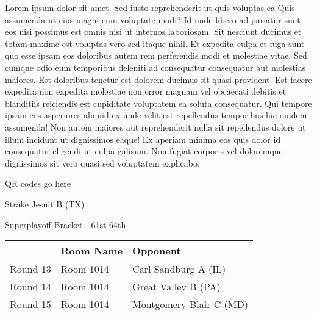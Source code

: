 \documentclass{article}%
\begin{document}
\vspace*{8pt}%
\linebreak%
\newline%
\newline%
Lorem ipsum dolor sit amet. Sed iusto reprehenderit ut quis voluptas ea Quis assumenda ut eius magni eum voluptate modi? Id unde libero ad pariatur sunt eos nisi possimus est omnis nisi ut internos laboriosam. Sit nesciunt ducimus et totam maxime est voluptas vero sed itaque nihil. Et expedita culpa et fuga sunt quo esse ipsam eos doloribus autem rem perferendis modi et molestiae vitae.\newline%
\newline%
Sed cumque odio eum temporibus deleniti ad consequatur consequatur aut molestias maiores. Est doloribus tenetur est dolorem ducimus sit quasi provident. Est facere expedita non expedita molestiae non error magnam vel obcaecati debitis et blanditiis reiciendis est cupiditate voluptatem ea soluta consequatur. Qui tempore ipsam eos asperiores aliquid ex unde velit est repellendus temporibus hic quidem assumenda!\newline%
\newline%
Non autem maiores aut reprehenderit nulla sit repellendus dolore ut illum incidunt ut dignissimos eaque! Ex aperiam minima eos quis dolor id consequatur eligendi ut culpa galisum. Non fugiat corporis vel doloremque dignissimos sit vero quasi sed voluptatem explicabo.\newline%
\newline%
%
\vspace*{30pt}%
\begin{center}%
\begin{Huge}%
QR codes go here%
\end{Huge}%
\end{center}%
\newpage%
\begin{center}%
\begin{Huge}%
Strake Jesuit B (TX)%
\end{Huge}%
\vspace*{8pt}%
\linebreak%
\begin{Large}%
Superplayoff Bracket {-} 61st{-}64th%
\end{Large}%
\end{center}%
%
\begin{tabularx}{\textwidth}{|c|Y|Y|}%
\hline%
&Room Name&Opponent\\%
\hline%
Round 13&Room 1014&Carl Sandburg A (IL)\\%
Round 14&Room 1014&Great Valley B (PA)\\%
Round 15&Room 1014&Montgomery Blair C (MD)\\%
\hline%
\end{tabularx}%
\end{document}
